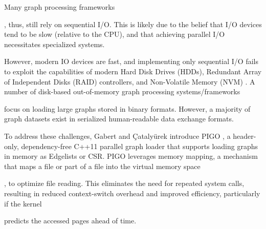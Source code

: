 Many graph processing frameworks, thus, still rely on sequential I/O. This is likely due to the belief that I/O devices tend to be slow (relative to the CPU), and that achieving parallel I/O necessitates specialized systems. However, modern IO devices are fast, and implementing only sequential I/O fails to exploit the capabilities of modern Hard Disk Drives (HDDs), Redundant Array of Independent Disks (RAID) controllers, and Non-Volatile Memory (NVM) \cite{gabert2021pigo}. A number of disk-based out-of-memory graph processing systems/frameworks \cite{kyrola2012graphchi, han2013turbograph, roy2013x, najeebullah2014bishard, lin2014mmap, zheng2015flashgraph, wang2021scaleg} focus on loading large graphs stored in binary formats. However, a majority of graph datasets exist in serialized human-readable data exchange formats.

To address these challenges, Gabert and Çatalyürek introduce PIGO \cite{gabert2021pigo}, a header-only, dependency-free C++11 parallel graph loader that supports loading graphs in memory as Edgelists or CSR. PIGO leverages memory mapping, a mechanism that maps a file or part of a file into the virtual memory space \cite{lin2014mmap}, to optimize file reading. This eliminates the need for repeated system calls, resulting in reduced context-switch overhead and improved efficiency, particularly if the kernel predicts the accessed pages ahead of time.

